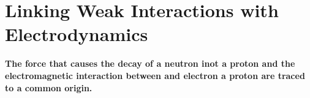 \chapter{Linking Weak Interactions with Electrodynamics}

\authinfo{}

{\bf The force that causes the decay of a neutron inot a proton and the electromagnetic interaction between and electron a proton are traced to a common origin.}


